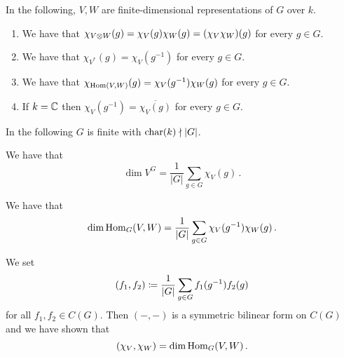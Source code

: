\begin{conventions}
  In the following, $V, W$ are finite-dimensional representations of $G$ over $k$.
\end{conventions}

\begin{lemma}
  \label{lemma: more characters for groups}
  \leavevmode
  \begin{enumerate}
    \item
      We have that $\chi_{V \mathbin{\otimes} W}(g) = \chi_V(g) \chi_W(g) = (\chi_V \chi_W)(g)$ for every $g \in G$.
    \item
      We have that $\chi_{V^*}(g) = \chi_V(g^{-1})$ for every $g \in G$.
    \item
      We have that $\chi_{\operatorname{Hom}(V, W)}(g) = \chi_V(g^{-1}) \chi_W(g)$ for every $g \in G$.
    \item
      If $k = \mathbb{C}$ then $\chi_V(g^{-1}) = \overline{\chi_V(g)}$ for every $g \in G$.
  \end{enumerate}
\end{lemma}


\begin{conventions}
  In the following $G$ is finite with $\operatorname{char}(k) \nmid |G|$.
\end{conventions}


\begin{lemma}
  We have that
  \[
      \dim V^G
    = \frac{1}{|G|} \sum_{g \in G} \chi_V(g) \,.
  \]
\end{lemma}


\begin{corollary}
  We have that
  \[
      \dim \operatorname{Hom}_G(V,W)
    = \frac{1}{|G|} \sum_{g \in G} \chi_V(g^{-1}) \chi_W(g) \,.
  \]
\end{corollary}


\begin{fluff}
  We set
  \[
              (f_1, f_2)
    \coloneqq  \frac{1}{|G|} \sum_{g \in G} f_1(g^{-1}) f_2(g)
  \]
  for all $f_1, f_2 \in C(G)$.
  Then $(-,-)$ is a symmetric bilinear form on $C(G)$ and we have shown that
  \[
      (\chi_V, \chi_W)
    = \dim \operatorname{Hom}_G(V,W) \,.
  \]
\end{fluff}


